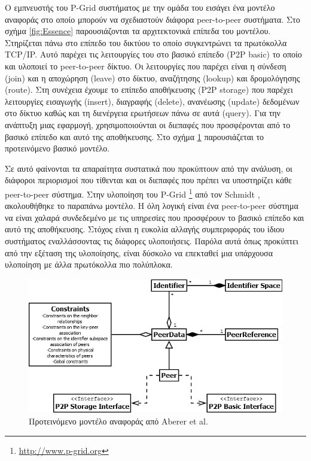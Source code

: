 Ο εμπνευστής του P-Grid συστήματος με την ομάδα του εισάγει ένα 
μοντέλο αναφοράς \citep{Aberer05theessence} στο οποίο μπορούν να σχεδιαστούν 
διάφορα peer-to-peer συστήματα. Στο σχήμα \ref{fig:Essence} παρουσιάζονται τα 
αρχιτεκτονικά επίπεδα του μοντέλου. Στηρίζεται πάνω στο επίπεδο του 
δικτύου το οποίο συγκεντρώνει τα πρωτόκολλα 
TCP/IP. Αυτό παρέχει τις λειτουργίες του στο βασικό επίπεδο (P2P basic) το οποίο και υλοποιεί το 
peer-to-peer δίκτυο. Οι λειτουργίες που παρέχει είναι η σύνδεση (join) 
και η αποχώρηση (leave) στο δίκτυο, αναζήτησης (lookup) και δρομολόγησης 
(route). 
Στη συνέχεια έχουμε το επίπεδο αποθήκευσης (P2P storage) που 
παρέχει λειτουργίες εισαγωγής (insert), διαγραφής (delete), ανανέωσης 
(update) δεδομένων στο δίκτυο καθώς και τη διενέργεια ερωτήσεων πάνω σε 
αυτά (query). Για την ανάπτυξη μιας εφαρμογή, χρησιμοποιούνται οι 
διεπαφές που προσφέρονται από το βασικό επίπεδο και αυτό της 
αποθήκευσης. Στο σχήμα \ref{fig:Essence_UML} παρουσιάζεται το 
προτεινόμενο βασικό μοντέλο.

Σε αυτό φαίνονται τα απαραίτητα συστατικά που προκύπτουν από την 
ανάλυση, οι διάφοροι περιορισμοί που τίθενται και οι διεπαφές που πρέπει 
να υποστηρίζει κάθε peer-to-peer σύστημα. Στην υλοποίηση του P-Grid 
\footnote{\url{http://www.p-grid.org}}
από τον Schmidt \citep{Schmidt2007}, ακολουθήθηκε το παραπάνω 
μοντέλο. Η όλη λογική είναι ένα peer-to-peer σύστημα να είναι χαλαρά 
συνδεδεμένο με τις υπηρεσίες που προσφέρουν το βασικό επίπεδο και αυτό 
της αποθήκευσης. Στόχος είναι η ευκολία αλλαγής συμπεριφοράς του ίδιου 
συστήματος εναλλάσσοντας τις διάφορες υλοποιήσεις. Παρόλα αυτά όπως 
προκύπτει από την εξέταση της υλοποίησης, είναι δύσκολο να επεκταθεί μια 
υπάρχουσα υλοποίηση με άλλα πρωτόκολλα πιο πολύπλοκα.

\begin{figure}[htpb]
  \begin{center}
    \includegraphics[scale=0.55]{Figures/Related_work/The_essence_of_p2p_(uml).png}
  \end{center}
  \caption{Προτεινόμενο μοντέλο αναφοράς από Aberer et al.}
  \label{fig:Essence_UML}
\end{figure}

